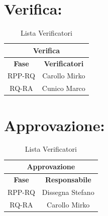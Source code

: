 	
\section*{\LARGE Verifica:}
\begin{table}[!h]
	\begin{center}
		\begin{tabular}
			{|c|c|}
			\hline
			\multicolumn{2}{|c|}{ \textbf{Verifica} } \\
			\hline
			\textbf{Fase} & \textbf{Verificatori} \\
			\hline
			\multirow{1}{*}{RPP-RQ} &  Carollo Mirko \\
									
			\hline
			\multirow{1}{*}{RQ-RA} & Cunico Marco \\
									
			\hline
		\end{tabular}
		\caption{Lista Verificatori} %
		\label{tabverifica}
	\end{center}
\end{table}

\section*{\LARGE Approvazione:}
\begin{table}[!h]
	\begin{center}
		\begin{tabular}
			{|c|c|}
			\hline
			\multicolumn{2}{|c|}{ \textbf{Approvazione} } \\
			\hline
			\textbf{Fase} & \textbf{Responsabile} \\
			\hline
			\multirow{1}{*}{RPP-RQ} &  Dissegna Stefano \\
									
			\hline
			\multirow{1}{*}{RQ-RA} & Carollo Mirko \\
									
			\hline
		\end{tabular}
		\caption{Lista Verificatori} %
		\label{tabverifica}
	\end{center}
\end{table}

